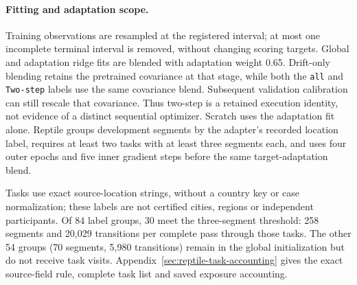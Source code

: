 \FloatBarrier
\paragraph{Fitting and adaptation scope.}
Training observations are resampled at the registered interval; at most one
incomplete terminal interval is removed, without changing scoring targets.
Global and adaptation ridge fits are blended with adaptation weight 0.65.
Drift-only blending retains the pretrained covariance at that stage, while
both the \texttt{all} and \texttt{Two-step} labels use the same covariance
blend. Subsequent validation calibration can still rescale that covariance.
Thus two-step is a retained execution identity, not evidence of a distinct
sequential optimizer. Scratch uses the adaptation fit alone. Reptile groups
development segments by the adapter's recorded location label, requires at least two tasks with
at least three segments each, and uses four outer epochs and five inner
gradient steps before the same target-adaptation blend.

Tasks use exact source-location strings, without a country key or case
normalization; these labels are not certified cities, regions or independent
participants. Of 84 label groups, 30 meet the three-segment threshold:
258 segments and 20,029 transitions per complete pass through those tasks.
The other 54 groups (70 segments, 5,980 transitions) remain in the global
initialization but do not receive task visits. Appendix~\ref{sec:reptile-task-accounting}
gives the exact source-field rule, complete task list and saved exposure accounting.

